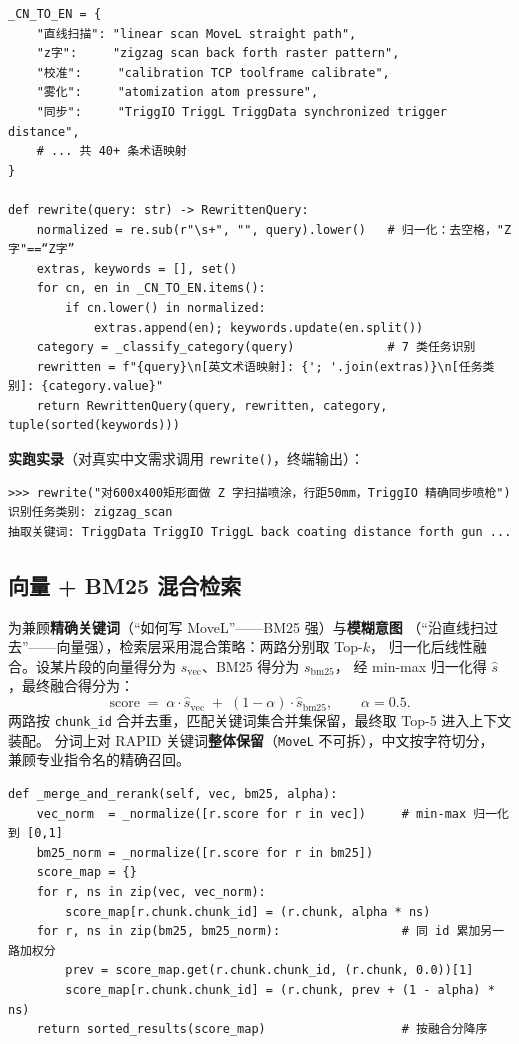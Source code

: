 \documentclass[12pt,a4paper,fontset=none]{ctexart}
\begin{document}
\begin{lstlisting}[style=py,caption={查询改写：中文→检索友好查询（节选）}]
_CN_TO_EN = {
    "直线扫描": "linear scan MoveL straight path",
    "z字":     "zigzag scan back forth raster pattern",
    "校准":     "calibration TCP toolframe calibrate",
    "雾化":     "atomization atom pressure",
    "同步":     "TriggIO TriggL TriggData synchronized trigger distance",
    # ... 共 40+ 条术语映射
}

def rewrite(query: str) -> RewrittenQuery:
    normalized = re.sub(r"\s+", "", query).lower()   # 归一化：去空格，"Z 字"==“Z字”
    extras, keywords = [], set()
    for cn, en in _CN_TO_EN.items():
        if cn.lower() in normalized:
            extras.append(en); keywords.update(en.split())
    category = _classify_category(query)             # 7 类任务识别
    rewritten = f"{query}\n[英文术语映射]: {'; '.join(extras)}\n[任务类别]: {category.value}"
    return RewrittenQuery(query, rewritten, category, tuple(sorted(keywords)))
\end{lstlisting}

\noindent\textbf{实跑实录}（对真实中文需求调用 \texttt{rewrite()}，终端输出）：
\begin{lstlisting}[style=console]
>>> rewrite("对600x400矩形面做 Z 字扫描喷涂，行距50mm，TriggIO 精确同步喷枪")
识别任务类别: zigzag_scan
抽取关键词: TriggData TriggIO TriggL back coating distance forth gun ...
\end{lstlisting}

\subsection{向量 + BM25 混合检索}
为兼顾\textbf{精确关键词}（“如何写 MoveL”——BM25 强）与\textbf{模糊意图}
（“沿直线扫过去”——向量强），检索层采用混合策略：两路分别取 Top-$k$，
归一化后线性融合。设某片段的向量得分为 $s_{\text{vec}}$、BM25 得分为 $s_{\text{bm25}}$，
经 min-max 归一化得 $\hat{s}$，最终融合得分为：
\[
  \text{score} \;=\; \alpha \cdot \hat{s}_{\text{vec}} \;+\; (1-\alpha)\cdot \hat{s}_{\text{bm25}},
  \qquad \alpha = 0.5 .
\]
两路按 \texttt{chunk\_id} 合并去重，匹配关键词集合并集保留，最终取 Top-5 进入上下文装配。
分词上对 RAPID 关键词\textbf{整体保留}（\texttt{MoveL} 不可拆），中文按字符切分，
兼顾专业指令名的精确召回。

\begin{lstlisting}[style=py,caption={混合检索的分数融合（节选）}]
def _merge_and_rerank(self, vec, bm25, alpha):
    vec_norm  = _normalize([r.score for r in vec])     # min-max 归一化到 [0,1]
    bm25_norm = _normalize([r.score for r in bm25])
    score_map = {}
    for r, ns in zip(vec, vec_norm):
        score_map[r.chunk.chunk_id] = (r.chunk, alpha * ns)
    for r, ns in zip(bm25, bm25_norm):                 # 同 id 累加另一路加权分
        prev = score_map.get(r.chunk.chunk_id, (r.chunk, 0.0))[1]
        score_map[r.chunk.chunk_id] = (r.chunk, prev + (1 - alpha) * ns)
    return sorted_results(score_map)                   # 按融合分降序
\end{lstlisting}
\end{document}
